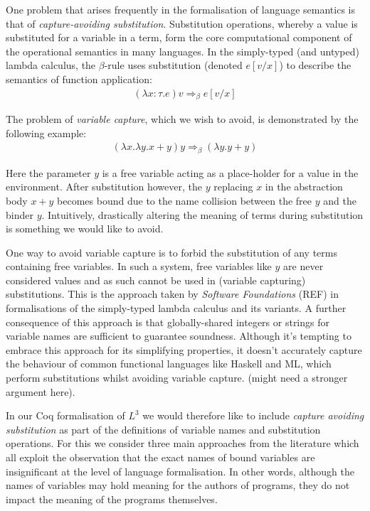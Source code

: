 \documentclass[]{unswthesis}
\begin{document}
One problem that arises frequently in the formalisation of language semantics is that of \textit{capture-avoiding substitution}. Substitution operations, whereby a value is substituted for a variable in a term, form the core computational component of the operational semantics in many languages. In the simply-typed (and untyped) lambda calculus, the $\beta$-rule uses substitution (denoted $e[v/x]$) to describe the semantics of function application:
\begin{eqnarray*}
(\lambda x : \tau. e) v \Rightarrow_\beta e[v/x]
\end{eqnarray*}

The problem of \textit{variable capture}, which we wish to avoid, is demonstrated by the following example:
\begin{eqnarray*}
(\lambda x. \lambda y. x + y) y \Rightarrow_\beta (\lambda y. y + y)
\end{eqnarray*}

Here the parameter $y$ is a free variable acting as a place-holder for a value in the environment. After substitution however, the $y$ replacing $x$ in the abstraction body $x + y$ becomes bound due to the name collision between the free $y$ and the binder $y$. Intuitively, drastically altering the meaning of terms during substitution is something we would like to avoid.

One way to avoid variable capture is to forbid the substitution of any terms containing free variables. In such a system, free variables like $y$ are never considered values and as such cannot be used in (variable capturing) substitutions. This is the approach taken by \textit{Software Foundations} (REF) in formalisations of the simply-typed lambda calculus and its variants. A further consequence of this approach is that globally-shared integers or strings for variable names are sufficient to guarantee soundness. Although it's tempting to embrace this approach for its simplifying properties, it doesn't accurately capture the behaviour of common functional languages like Haskell and ML, which perform substitutions whilst avoiding variable capture. (might need a stronger argument here).

In our Coq formalisation of $L^3$ we would therefore like to include \textit{capture avoiding substitution} as part of the definitions of variable names and substitution operations. For this we consider three main approaches from the literature which all exploit the observation that the exact names of bound variables are insignificant at the level of language formalisation. In other words, although the names of variables may hold meaning for the authors of programs, they do not impact the meaning of the programs themselves.
\end{document}
